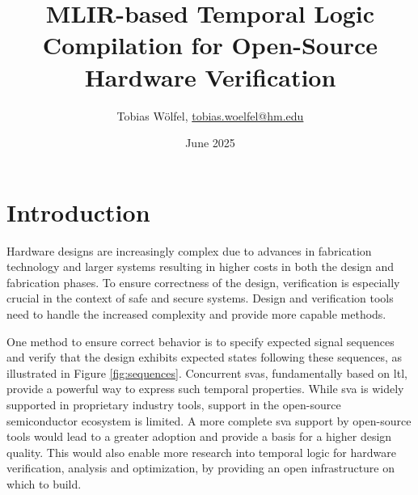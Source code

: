 \documentclass[11pt,DIV=16,parskip=half]{scrartcl}
\title{MLIR-based Temporal Logic Compilation for Open-Source Hardware Verification}
\author{Tobias Wölfel, \href{mailto:tobias.woelfel@hm.edu}{tobias.woelfel@hm.edu}}
\date{June 2025}
\begin{document}
\maketitle

\section{Introduction}

Hardware designs are increasingly complex due to advances in fabrication
technology and larger systems resulting in higher costs in both the
design and fabrication phases.
To ensure correctness of the design, verification is especially crucial in the
context of safe and secure systems.
Design and verification tools need to handle the increased complexity and
provide more capable methods.

One method to ensure correct behavior is to specify expected signal sequences
and verify that the design exhibits expected states following these
sequences, as illustrated in Figure \ref{fig:sequences}.
Concurrent \glspl{sva}, fundamentally based on \gls{ltl}, provide a powerful
way to express such temporal properties.
While \gls{sva} is widely supported in proprietary industry tools, support
in the open-source semiconductor ecosystem is limited.
A more complete \gls{sva} support by open-source tools would lead to a greater
adoption and provide a basis for a higher design quality.
This would also enable more research into temporal logic for hardware
verification, analysis and optimization, by providing an open infrastructure on
which to build.
\end{document}
